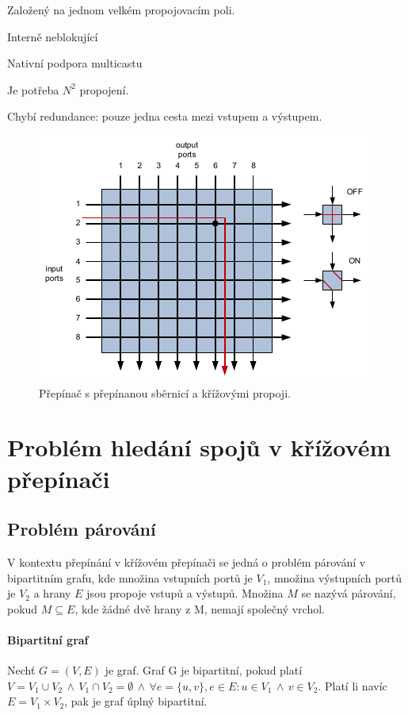 \begin{compactitem}
    \item Založený na jednom velkém propojovacím poli.
    \item Interně neblokující
    \item Nativní podpora multicastu
    \item Je potřeba $N^2$ propojení.
    \item Chybí redundance: pouze jedna cesta mezi vstupem a výstupem.
\end{compactitem}

\begin{figure}[H]
    \centering
    \includegraphics[width=0.75\linewidth]{prepinana_deska_krizovy.pdf}
    \caption{Přepínač s přepínanou sběrnicí a křížovými propoji.}
\end{figure}


\section{Problém hledání spojů v křížovém přepínači}

\subsection{Problém párování}

V kontextu přepínání v křížovém přepínači se jedná o problém párování v bipartitním grafu, kde množina vstupních portů je $V_1$, množina výstupních portů je $V_2$ a hrany $E$ jsou propoje vstupů a výstupů. Množina $M$ se nazývá párování, pokud $M \subseteq E$, kde žádné dvě hrany z M, nemají společný vrchol.

\paragraph*{Bipartitní graf} Nechť $G = (V, E)$ je graf. Graf G je bipartitní, pokud platí $V = V_1 \cup V_2 \, \land \, V_1 \cap V_2 = \emptyset \, \land \, \forall e = \{u, v\}, e \in E : u \in V_1 \, \land \, v \in V_2$. Platí li navíc $E = V_1 \times V_2$, pak je graf úplný bipartitní.

